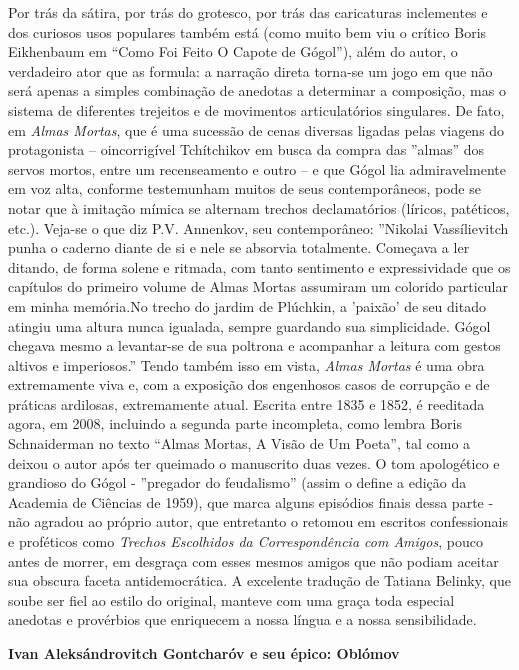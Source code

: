 Por trás da sátira, por trás do grotesco, por trás das caricaturas
inclementes e dos curiosos usos populares também está (como muito bem
viu o crítico Boris Eikhenbaum em ``Como Foi Feito O Capote de Gógol''),
além do autor, o verdadeiro ator que as formula: a narração direta
torna-se um jogo em que não será apenas a simples combinação de anedotas
a determinar a composição, mas o sistema de diferentes trejeitos e de
movimentos articulatórios singulares. De fato, em \emph{Almas Mortas},
que é uma sucessão de cenas diversas ligadas pelas viagens do
protagonista -- oincorrigível Tchítchikov em busca da compra das
''almas'' dos servos mortos, entre um recenseamento e outro -- e que
Gógol lia admiravelmente em voz alta, conforme testemunham muitos de
seus contemporâneos, pode se notar que à imitação mímica se alternam
trechos declamatórios (líricos, patéticos, etc.). Veja-se o que diz P.V.
Annenkov, seu contemporâneo: ''Nikolai Vassílievitch punha o caderno
diante de si e nele se absorvia totalmente. Começava a ler ditando, de
forma solene e ritmada, com tanto sentimento e expressividade que os
capítulos do primeiro volume de Almas Mortas assumiram um colorido
particular em minha memória.No trecho do jardim de Plúchkin, a 'paixão'
de seu ditado atingiu uma altura nunca igualada, sempre guardando sua
simplicidade. Gógol chegava mesmo a levantar-se de sua poltrona e
acompanhar a leitura com gestos altivos e imperiosos.'' Tendo também
isso em vista, \emph{Almas Mortas} é uma obra extremamente viva e, com a
exposição dos engenhosos casos de corrupção e de práticas ardilosas,
extremamente atual. Escrita entre 1835 e 1852, é reeditada agora, em
2008, incluindo a segunda parte incompleta, como lembra Boris
Schnaiderman no texto ``Almas Mortas, A Visão de Um Poeta'', tal como a
deixou o autor após ter queimado o manuscrito duas vezes. O tom
apologético e grandioso do Gógol - ''pregador do feudalismo'' (assim o
define a edição da Academia de Ciências de 1959), que marca alguns
episódios finais dessa parte - não agradou ao próprio autor, que
entretanto o retomou em escritos confessionais e proféticos como
\emph{Trechos Escolhidos da Correspondência com Amigos}, pouco antes de
morrer, em desgraça com esses mesmos amigos que não podiam aceitar sua
obscura faceta antidemocrática. A excelente tradução de Tatiana Belinky,
que soube ser fiel ao estilo do original, manteve com uma graça toda
especial anedotas e provérbios que enriquecem a nossa língua e a nossa
sensibilidade.

\protect\hypertarget{__DdeLink__16846_1485881000}{}{}\textbf{Ivan
Aleksándrovitch Gontcharóv e seu épico: Oblómov}

